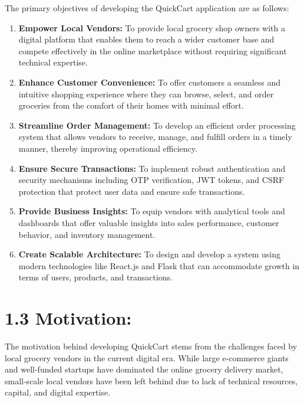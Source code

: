 \documentclass[12pt,a4paper]{report}
\begin{document}
The primary objectives of developing the QuickCart application are as follows:

\begin{enumerate}
    \item \textbf{Empower Local Vendors:} To provide local grocery shop owners with a digital platform that enables them to reach a wider customer base and compete effectively in the online marketplace without requiring significant technical expertise.
    
    \item \textbf{Enhance Customer Convenience:} To offer customers a seamless and intuitive shopping experience where they can browse, select, and order groceries from the comfort of their homes with minimal effort.
    
    \item \textbf{Streamline Order Management:} To develop an efficient order processing system that allows vendors to receive, manage, and fulfill orders in a timely manner, thereby improving operational efficiency.
    
    \item \textbf{Ensure Secure Transactions:} To implement robust authentication and security mechanisms including OTP verification, JWT tokens, and CSRF protection that protect user data and ensure safe transactions.
    
    \item \textbf{Provide Business Insights:} To equip vendors with analytical tools and dashboards that offer valuable insights into sales performance, customer behavior, and inventory management.
    
    \item \textbf{Create Scalable Architecture:} To design and develop a system using modern technologies like React.js and Flask that can accommodate growth in terms of users, products, and transactions.
\end{enumerate}

\section*{1.3 Motivation:}

The motivation behind developing QuickCart stems from the challenges faced by local grocery vendors in the current digital era. While large e-commerce giants and well-funded startups have dominated the online grocery delivery market, small-scale local vendors have been left behind due to lack of technical resources, capital, and digital expertise.
\end{document}
